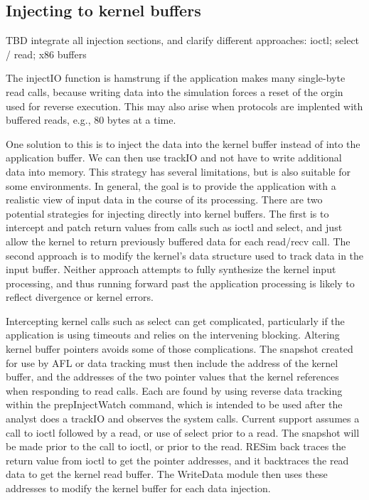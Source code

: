 \documentclass[titlepage]{article}
\begin{document}
\begin{appendices}
\section{Injecting to kernel buffers}
TBD integrate all injection sections, and clarify different approaches: ioctl; select / read; x86 buffers


The injectIO function is hamstrung if the application makes many single-byte read calls, because writing data into the
simulation forces a reset of the orgin used for reverse execution.  This may also arise when protocols are implented
with buffered reads, e.g., 80 bytes at a time.

One solution to this is to inject the data into the kernel buffer instead of into the application buffer.
We can then use trackIO and not have to write additional data into memory.  This strategy has several limitations, but
is also suitable for some environments.  In general, the goal is to provide the application with a realistic view of
input data in the course of its processing.  There are two potential strategies for injecting directly into kernel buffers.
The first is to intercept and patch return values from calls such as ioctl and select, and just allow the kernel to 
return previously buffered data for each read/recv call.  The second approach is to modify the kernel's data structure
used to track data in the input buffer.  Neither approach attempts to fully synthesize the kernel input processing, and thus
running forward past the application processing is likely to reflect divergence or kernel errors.

Intercepting kernel calls such as select can get complicated, particularly if the application is using timeouts and relies
on the intervening blocking.  Altering kernel buffer pointers avoids some of those complications.  The snapshot created
for use by AFL or data tracking must then include the address of the kernel buffer, and the addresses of the two pointer
values that the kernel references when responding to read calls.  Each are found by using reverse data tracking within the
prepInjectWatch command, which is intended to be used after the analyst does a trackIO and observes the system calls.
Current support assumes a call to ioctl followed by a read, or use of select prior to a read.  The snapshot will be made prior to the call to ioctl, or
prior to the read.  RESim
back traces the return value from ioctl to get the pointer addresses, and it backtraces the read data to get the kernel
read buffer.  The WriteData module then uses these addresses to modify the kernel buffer for each data injection.



\end{appendices}
\end{document}
